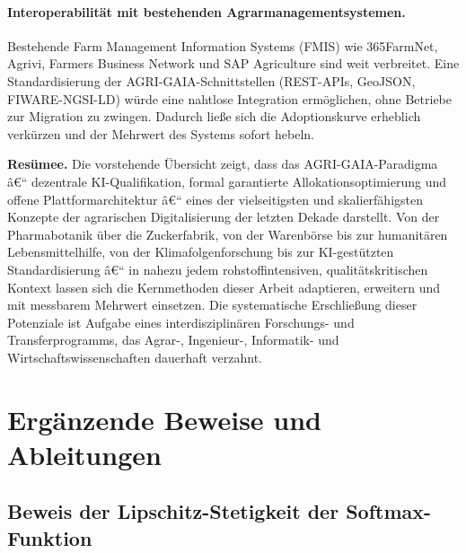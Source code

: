 ﻿\documentclass[12pt,a4paper]{article}
\theoremstyle{plain}
\theoremstyle{definition}
\begin{document}
	\paragraph{Interoperabilität mit bestehenden Agrarmanagementsystemen.}
	Bestehende Farm Management Information Systems (FMIS) wie
	365FarmNet, Agrivi, Farmers Business Network und SAP Agriculture
	sind weit verbreitet. Eine Standardisierung der AGRI-GAIA-Schnittstellen
	(REST-APIs, GeoJSON, FIWARE-NGSI-LD) würde eine nahtlose
	Integration ermöglichen, ohne Betriebe zur Migration zu zwingen.
	Dadurch ließe sich die Adoptionskurve erheblich verkürzen und
	der Mehrwert des Systems sofort hebeln.

	\bigskip
	\noindent
	\textbf{Resümee.}
	Die vorstehende Übersicht zeigt, dass das AGRI-GAIA-Paradigma â€“
	dezentrale KI-Qualifikation, formal garantierte Allokationsoptimierung
	und offene Plattformarchitektur â€“ eines der vielseitigsten und
	skalierfähigsten Konzepte der agrarischen Digitalisierung der letzten
	Dekade darstellt. Von der Pharmabotanik über die Zuckerfabrik, von
	der Warenbörse bis zur humanitären Lebensmittelhilfe, von der
	Klimafolgenforschung bis zur KI-gestützten Standardisierung â€“
	in nahezu jedem rohstoffintensiven, qualitätskritischen Kontext
	lassen sich die Kernmethoden dieser Arbeit adaptieren, erweitern und
	mit messbarem Mehrwert einsetzen. Die systematische Erschließung
	dieser Potenziale ist Aufgabe eines interdisziplinären Forschungs-
	und Transferprogramms, das Agrar-, Ingenieur-, Informatik-
	und Wirtschaftswissenschaften dauerhaft verzahnt.

	\appendix
	\section{Ergänzende Beweise und Ableitungen}
	
	\subsection{Beweis der Lipschitz-Stetigkeit der Softmax-Funktion}
	
\end{document}

